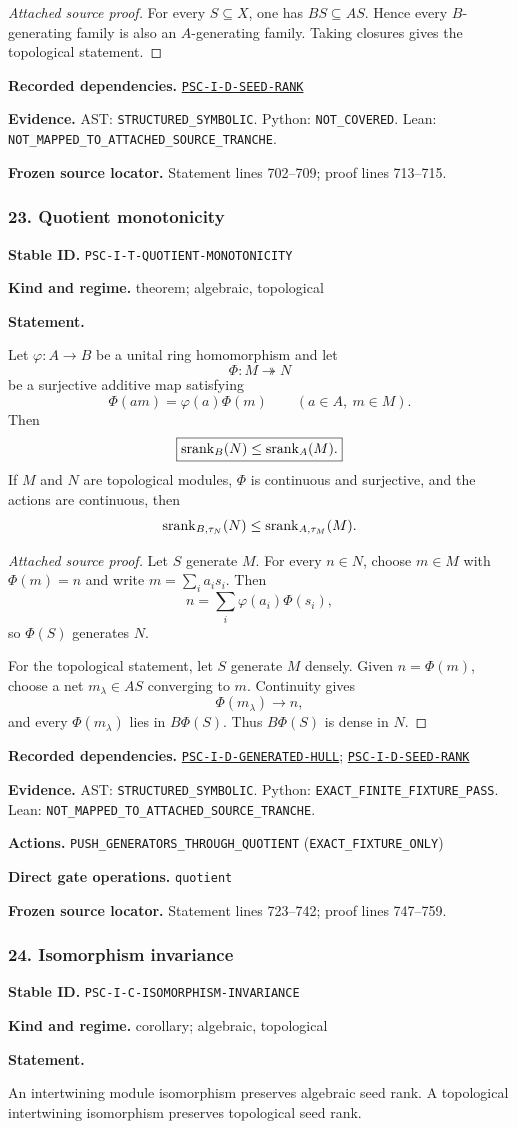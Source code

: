 \documentclass[a4paper,11pt]{article}
\newcommand{\field}[2]{\noindent\textbf{#1.} #2\par}
\begin{document}
\begin{proof}[Attached source proof]
For every $S\subseteq X$, one has $BS\subseteq AS$.  Hence every $B$-generating family is also an $A$-generating family.  Taking closures gives the topological statement.
\end{proof}
\field{Recorded dependencies}{\hyperref[rec:PSC-I-D-SEED-RANK]{\nolinkurl{PSC-I-D-SEED-RANK}}}
\field{Evidence}{AST: \nolinkurl{STRUCTURED_SYMBOLIC}. Python: \nolinkurl{NOT_COVERED}. Lean: \nolinkurl{NOT_MAPPED_TO_ATTACHED_SOURCE_TRANCHE}.}
\field{Frozen source locator}{Statement lines 702--709; proof lines 713--715.}
\subsubsection*{23. Quotient monotonicity}
\label{rec:PSC-I-T-QUOTIENT-MONOTONICITY}
\field{Stable ID}{\nolinkurl{PSC-I-T-QUOTIENT-MONOTONICITY}}
\field{Kind and regime}{theorem; algebraic, topological}
\textbf{Statement.}\par
Let $\varphi:A\to B$ be a unital ring homomorphism and let
\[
\Phi:M\twoheadrightarrow N
\]
be a surjective additive map satisfying
\[
\Phi(am)=\varphi(a)\Phi(m)
\qquad(a\in A,\ m\in M).
\]
Then
\[
\boxed{\operatorname{srank}_B(N)\leq\operatorname{srank}_A(M).}
\]
If $M$ and $N$ are topological modules, $\Phi$ is continuous and surjective, and the actions are continuous, then
\[
\operatorname{srank}_{B,\tau_N}(N)\leq\operatorname{srank}_{A,\tau_M}(M).
\]

\begin{proof}[Attached source proof]
Let $S$ generate $M$.  For every $n\in N$, choose $m\in M$ with $\Phi(m)=n$ and write $m=\sum_ia_is_i$.  Then
\[
n=\sum_i\varphi(a_i)\Phi(s_i),
\]
so $\Phi(S)$ generates $N$.

For the topological statement, let $S$ generate $M$ densely.  Given $n=\Phi(m)$, choose a net $m_\lambda\in AS$ converging to $m$.  Continuity gives
\[
\Phi(m_\lambda)\longrightarrow n,
\]
and every $\Phi(m_\lambda)$ lies in $B\Phi(S)$.  Thus $B\Phi(S)$ is dense in $N$.
\end{proof}
\field{Recorded dependencies}{\hyperref[rec:PSC-I-D-GENERATED-HULL]{\nolinkurl{PSC-I-D-GENERATED-HULL}}; \hyperref[rec:PSC-I-D-SEED-RANK]{\nolinkurl{PSC-I-D-SEED-RANK}}}
\field{Evidence}{AST: \nolinkurl{STRUCTURED_SYMBOLIC}. Python: \nolinkurl{EXACT_FINITE_FIXTURE_PASS}. Lean: \nolinkurl{NOT_MAPPED_TO_ATTACHED_SOURCE_TRANCHE}.}
\field{Actions}{\nolinkurl{PUSH_GENERATORS_THROUGH_QUOTIENT} (\nolinkurl{EXACT_FIXTURE_ONLY})}
\field{Direct gate operations}{\nolinkurl{quotient}}
\field{Frozen source locator}{Statement lines 723--742; proof lines 747--759.}
\subsubsection*{24. Isomorphism invariance}
\label{rec:PSC-I-C-ISOMORPHISM-INVARIANCE}
\field{Stable ID}{\nolinkurl{PSC-I-C-ISOMORPHISM-INVARIANCE}}
\field{Kind and regime}{corollary; algebraic, topological}
\textbf{Statement.}\par
An intertwining module isomorphism preserves algebraic seed rank.  A topological intertwining isomorphism preserves topological seed rank.
\end{document}
